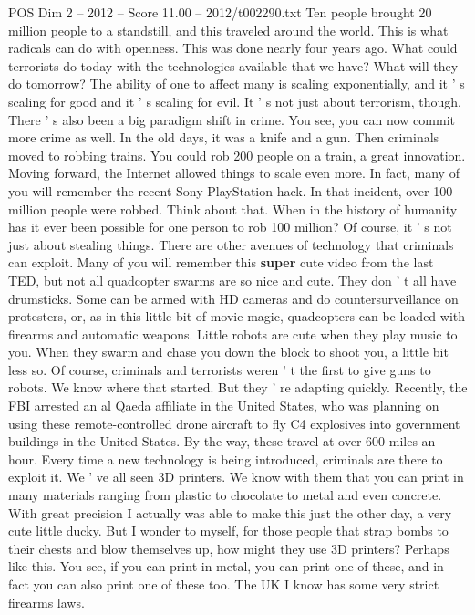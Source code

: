 \begin{textsample}{POS Dim 2 – 2012 – Score 11.00 – 2012/t002290.txt}
Ten people brought 20 million people to a standstill, and this traveled around the world.
This is what radicals can do with openness.
This was done nearly four years ago.
What could terrorists do today with the technologies available that we have?
What will they do tomorrow?
The ability of one to affect many is scaling exponentially, and it ' s scaling for good and it ' s scaling for evil.
It ' s not just about terrorism, though.
There ' s also been a big paradigm shift in crime.
You see, you can now commit more crime as well.
In the old days, it was a knife and a gun.
Then criminals moved to robbing trains.
You could rob 200 people on a train, a great innovation.
Moving forward, the Internet allowed things to scale even more.
In fact, many of you will remember the recent Sony PlayStation hack.
In that incident, over 100 million people were robbed.
Think about that.
When in the history of humanity has it ever been possible for one person to rob 100 million?
Of course, it ' s not just about stealing things.
There are other avenues of technology that criminals can exploit.
Many of you will remember this \textbf{super} cute video from the last TED, but not all quadcopter swarms are so nice and cute.
They don ' t all have drumsticks.
Some can be armed with HD cameras and do countersurveillance on protesters, or, as in this little bit of movie magic, quadcopters can be loaded with firearms and automatic weapons.
Little robots are cute when they play music to you.
When they swarm and chase you down the block to shoot you, a little bit less so.
Of course, criminals and terrorists weren ' t the first to give guns to robots.
We know where that started.
But they ' re adapting quickly.
Recently, the FBI arrested an al Qaeda affiliate in the United States, who was planning on using these remote-controlled drone aircraft to fly C4 explosives into government buildings in the United States.
By the way, these travel at over 600 miles an hour.
Every time a new technology is being introduced, criminals are there to exploit it.
We ' ve all seen 3D printers.
We know with them that you can print in many materials ranging from plastic to chocolate to metal and even concrete.
With great precision I actually was able to make this just the other day, a very cute little ducky.
But I wonder to myself, for those people that strap bombs to their chests and blow themselves up, how might they use 3D printers?
Perhaps like this.
You see, if you can print in metal, you can print one of these, and in fact you can also print one of these too.
The UK I know has some very strict firearms laws.

\end{textsample}
